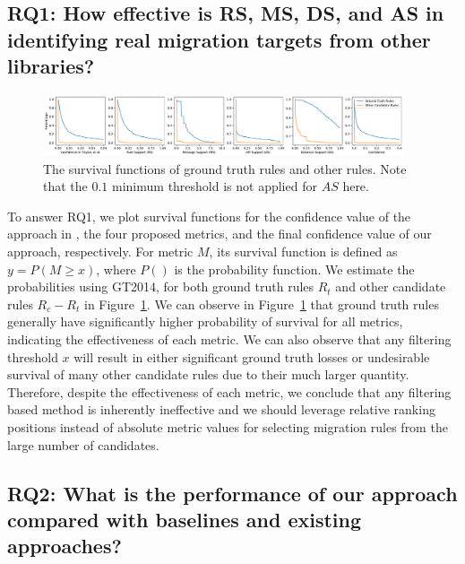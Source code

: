 \documentclass[conference, 10pt]{IEEEtran}
\begin{document}
\subsection{RQ1: How effective is RS, MS, DS, and AS in identifying real migration targets from other libraries?}

\begin{figure}[tb]
  \centering
  \includegraphics[width=0.95\textwidth]{fig/dist.pdf}
  \caption{The survival functions of ground truth rules and other rules. Note that the $0.1$ minimum threshold is not applied for $AS$ here.}
  \label{fig:dist}
\vspace{-5mm}
\end{figure}

To answer RQ1, we plot survival functions for the confidence value of the approach in \cite{2012WCRE-Teyton-Mining},
the four proposed metrics, and the final confidence value of our approach, respectively. For metric $M$, its survival function is defined as $y=P(M\ge x)$, where $P()$ is the probability function.
We estimate the probabilities using GT2014, for both ground truth rules $R_t$ and other candidate rules $R_c-R_t$ %
in Figure~\ref{fig:dist}. 
We can observe in Figure~\ref{fig:dist} that ground truth rules generally have significantly higher probability of survival for all metrics, indicating the effectiveness of each metric.
We can also observe that any filtering threshold $x$ will result in either significant ground truth losses or undesirable survival of many other candidate rules due to their much larger quantity.
Therefore, despite the effectiveness of each metric, we conclude that any filtering based method is inherently ineffective and we should leverage relative ranking positions instead of absolute metric values for selecting migration rules from the large number of candidates.

\subsection{RQ2: What is the performance of our approach compared with  baselines and existing approaches?}\label{ss:rq2}
\end{document}
